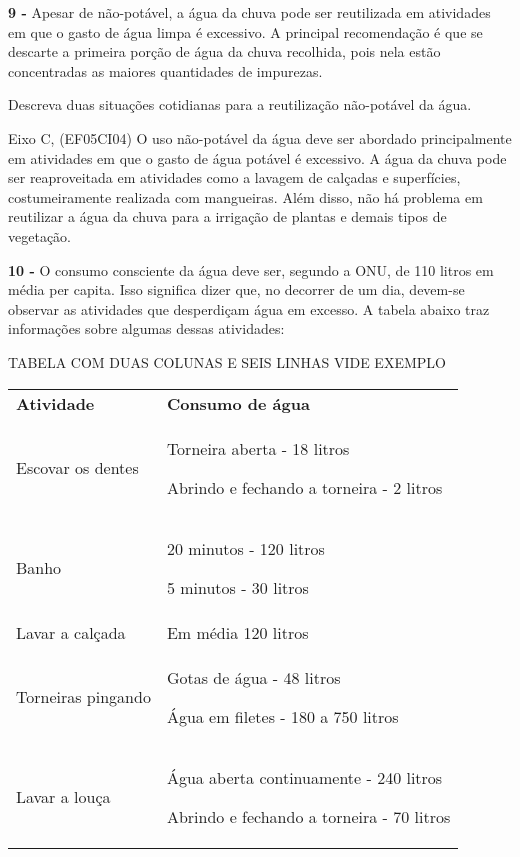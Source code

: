 \textbf{9 -} Apesar de não-potável, a água da chuva pode ser reutilizada
em atividades em que o gasto de água limpa é excessivo. A principal
recomendação é que se descarte a primeira porção de água da chuva
recolhida, pois nela estão concentradas as maiores quantidades de
impurezas.

Descreva duas situações cotidianas para a reutilização não-potável da
água.

Eixo C, (EF05CI04) O uso não-potável da água deve ser abordado
principalmente em atividades em que o gasto de água potável é excessivo.
A água da chuva pode ser reaproveitada em atividades como a lavagem de
calçadas e superfícies, costumeiramente realizada com mangueiras. Além
disso, não há problema em reutilizar a água da chuva para a irrigação de
plantas e demais tipos de vegetação.

\textbf{10 -} O consumo consciente da água deve ser, segundo a ONU, de
110 litros em média per capita. Isso significa dizer que, no decorrer de
um dia, devem-se observar as atividades que desperdiçam água em excesso.
A tabela abaixo traz informações sobre algumas dessas atividades:

TABELA COM DUAS COLUNAS E SEIS LINHAS VIDE EXEMPLO

\begin{longtable}[]{@{}ll@{}}
\toprule
\textbf{Atividade} & \textbf{Consumo de água}\tabularnewline
\begin{minipage}[t]{0.48\columnwidth}\raggedright\strut
Escovar os dentes\strut
\end{minipage} & \begin{minipage}[t]{0.48\columnwidth}\raggedright\strut
Torneira aberta - 18 litros

Abrindo e fechando a torneira - 2 litros\strut
\end{minipage}\tabularnewline
\begin{minipage}[t]{0.48\columnwidth}\raggedright\strut
Banho\strut
\end{minipage} & \begin{minipage}[t]{0.48\columnwidth}\raggedright\strut
20 minutos - 120 litros

5 minutos - 30 litros\strut
\end{minipage}\tabularnewline
Lavar a calçada & Em média 120 litros\tabularnewline
\begin{minipage}[t]{0.48\columnwidth}\raggedright\strut
Torneiras pingando\strut
\end{minipage} & \begin{minipage}[t]{0.48\columnwidth}\raggedright\strut
Gotas de água - 48 litros

Água em filetes - 180 a 750 litros\strut
\end{minipage}\tabularnewline
\begin{minipage}[t]{0.48\columnwidth}\raggedright\strut
Lavar a louça\strut
\end{minipage} & \begin{minipage}[t]{0.48\columnwidth}\raggedright\strut
Água aberta continuamente - 240 litros

Abrindo e fechando a torneira - 70 litros\strut
\end{minipage}\tabularnewline
\bottomrule
\end{longtable}


